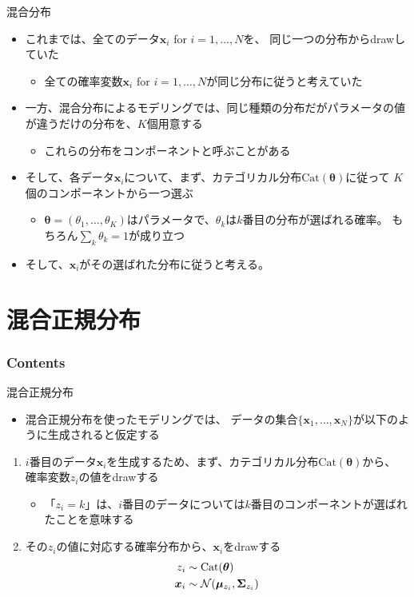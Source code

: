 \documentclass[aspectratio=169,unicode,dvipdfmx,14pt]{beamer}
\begin{document}
\begin{frame}{混合分布}
\begin{itemize}
\item これまでは、全てのデータ$\bm{x}_i$ for $i=1,\ldots,N$を、
同じ一つの分布からdrawしていた
\begin{itemize}
\item 全ての確率変数$\bm{x}_i$ for $i=1,\ldots,N$が同じ分布に従うと考えていた
\end{itemize}
\item 一方、混合分布によるモデリングでは、同じ種類の分布だがパラメータの値が違うだけの分布を、$K$個用意する
\begin{itemize}
\item これらの分布をコンポーネントと呼ぶことがある
\end{itemize}
\item そして、各データ$\bm{x}_i$について、まず、カテゴリカル分布$\mbox{Cat}(\bm{\theta})$に従って
$K$個のコンポーネントから一つ選ぶ
\begin{itemize}
\item $\bm{\theta}=(\theta_1,\ldots,\theta_K)$はパラメータで、$\theta_k$は$k$番目の分布が選ばれる確率。
もちろん$\sum_k \theta_k = 1$が成り立つ
\end{itemize}
\item そして、$\bm{x}_i$がその選ばれた分布に従うと考える。
\end{itemize}
\end{frame}


\section{混合正規分布}

\begin{frame}\frametitle{Contents}
\Large \tableofcontents[currentsection]
\end{frame}

\begin{frame}{混合正規分布}
\begin{itemize}
\item 混合正規分布を使ったモデリングでは、
データの集合$\{\bm{x}_1, \ldots, \bm{x}_N\}$が以下のように生成されると仮定する
\end{itemize}
\begin{enumerate}
\item $i$番目のデータ$\bm{x}_i$を生成するため、まず、カテゴリカル分布$\mbox{Cat}(\bm{\theta})$から、
確率変数$z_i$の値をdrawする
\begin{itemize}
\item 「$z_i = k$」は、$i$番目のデータについては$k$番目のコンポーネントが選ばれたことを意味する
\end{itemize}
\item その$z_i$の値に対応する確率分布から、$\bm{x}_i$をdrawする
\begin{align}
z_i & \sim \mbox{Cat}(\bm{\theta}) \notag \\
\bm{x}_i & \sim \mathcal{N}(\bm{\mu}_{z_i}, \bm{\Sigma}_{z_i})
\end{align}
\end{enumerate}
\end{frame}
\end{document}
